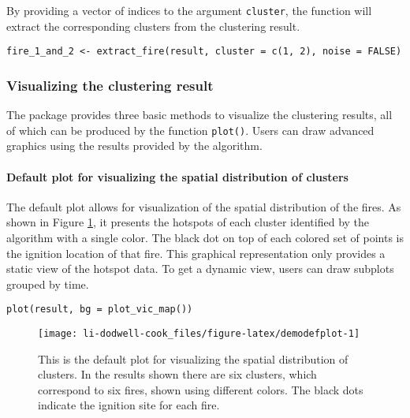 By providing a vector of indices to the argument \texttt{cluster}, the function will extract the corresponding clusters from the clustering result.

\begin{verbatim}
fire_1_and_2 <- extract_fire(result, cluster = c(1, 2), noise = FALSE)
\end{verbatim}

\hypertarget{visualizing-the-clustering-result}{%
\subsubsection{Visualizing the clustering result}\label{visualizing-the-clustering-result}}

The package provides three basic methods to visualize the clustering results, all of which can be produced by the function \texttt{plot()}. Users can draw advanced graphics using the results provided by the algorithm.

\hypertarget{default-plot-for-visualizing-the-spatial-distribution-of-clusters}{%
\paragraph{Default plot for visualizing the spatial distribution of clusters}\label{default-plot-for-visualizing-the-spatial-distribution-of-clusters}}

The default plot allows for visualization of the spatial distribution of the fires. As shown in Figure \ref{fig:demodefplot}, it presents the hotspots of each cluster identified by the algorithm with a single color. The black dot on top of each colored set of points is the ignition location of that fire.
This graphical representation only provides a static view of the hotspot data. To get a dynamic view, users can draw subplots grouped by time.

\begin{verbatim}
plot(result, bg = plot_vic_map())
\end{verbatim}

\begin{figure}

{\centering \texttt{[image: li-dodwell-cook\_files/figure-latex/demodefplot-1]} 

}

\caption{This is the default plot for visualizing the spatial distribution of clusters. In the results shown there are six clusters, which correspond to six fires, shown using different colors. The black dots indicate the ignition site for each fire.}\label{fig:demodefplot}
\end{figure}

